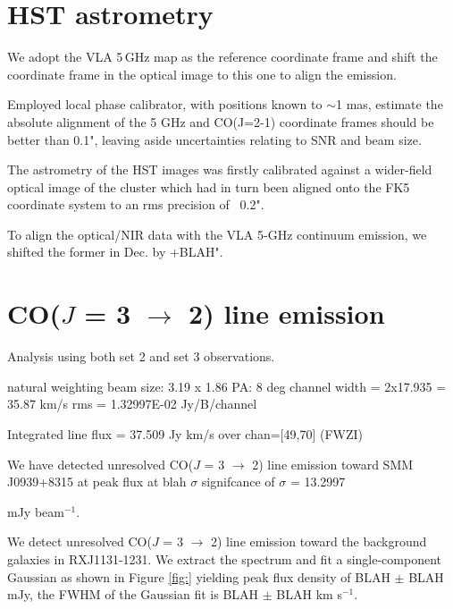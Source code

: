 \documentclass[]{emulateapj}
\begin{document}
\author{Draft}



\section{HST astrometry}
We adopt the VLA 5\,GHz map as the reference coordinate frame and shift the
coordinate frame in the optical image to this one to align the emission.

Employed local phase calibrator, with positions known to $\sim$1 mas, estimate
the absolute alignment of the 5 GHz and CO(J=2-1) coordinate frames should
be better than 0.1", leaving aside uncertainties relating to SNR and beam size.

The astrometry of the HST images was firstly calibrated against a wider-field
optical image of the cluster which had in turn been aligned onto the FK5
coordinate system to an rms precision of ~0.2".


To align the optical/NIR data with the VLA 5-GHz continuum emission, we
shifted the former in Dec. by +BLAH".



\section{CO($J$ = 3 $\rightarrow$ 2) line emission}

Analysis using both set 2 and set 3 observations. 

natural weighting beam size:  3.19 x 1.86 PA: 8 deg
channel width = 2x17.935 = 35.87 km/s
rms = 1.32997E-02 Jy/B/channel

 Integrated line flux = 37.509 Jy km/s over chan=[49,70] (FWZI)

We have detected unresolved CO($J$ = 3 $\rightarrow$ 2) line emission toward
SMM J0939+8315 at peak flux at blah $\sigma$ signifcance of $ \sigma$ = 13.2997

mJy beam$^{-1}$.

We detect unresolved CO($J$ = 3 $\rightarrow$ 2) line emission toward the
background galaxies in RXJ1131-1231. 
We extract the spectrum and fit a single-component Gaussian as shown in Figure
\ref{fig:}
yielding peak flux density of BLAH $\pm$ BLAH mJy, the FWHM of the Gaussian fit
is BLAH $\pm$ BLAH km s$^{-1}$. 
\end{document}
